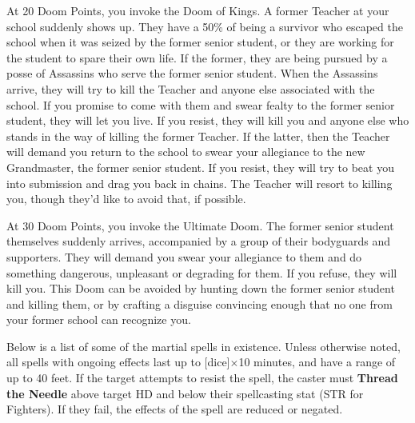 \documentclass[twoside]{article}
\newcommand{\TTN}[2]{\textbf{Thread the Needle} above #1 and below #2}
\begin{document}
\bigbreak

At 20 Doom Points, you invoke the Doom of Kings. A former Teacher at your school suddenly shows up. They have a 50\% of being a survivor who escaped the school when it was seized by the former senior student, or they are working for the student to spare their own life. If the former, they are being pursued by a posse of Assassins who serve the former senior student. When the Assassins arrive, they will try to kill the Teacher and anyone else associated with the school. If you promise to come with them and swear fealty to the former senior student, they will let you live. If you resist, they will kill you and anyone else who stands in the way of killing the former Teacher. If the latter, then the Teacher will demand you return to the school to swear your allegiance to the new Grandmaster, the former senior student. If you resist, they will try to beat you into submission and drag you back in chains. The Teacher will resort to killing you, though they'd like to avoid that, if possible.

\bigbreak

At 30 Doom Points, you invoke the Ultimate Doom. The former senior student themselves suddenly arrives, accompanied by a group of their bodyguards and supporters. They will demand you swear your allegiance to them and do something dangerous, unpleasant or degrading for them. If you refuse, they will kill you. This Doom can be avoided by hunting down the former senior student and killing them, or by crafting a disguise convincing enough that no one from your former school can recognize you.

\bigbreak

Below is a list of some of the martial spells in existence. Unless otherwise noted, all spells with ongoing effects last up to [dice]$\times$10 minutes, and have a range of up to 40 feet. If the target attempts to resist the spell, the caster must \TTN{target HD}{their spellcasting stat (STR for Fighters)}. If they fail, the effects of the spell are reduced or negated.

\bigbreak
\end{document}
